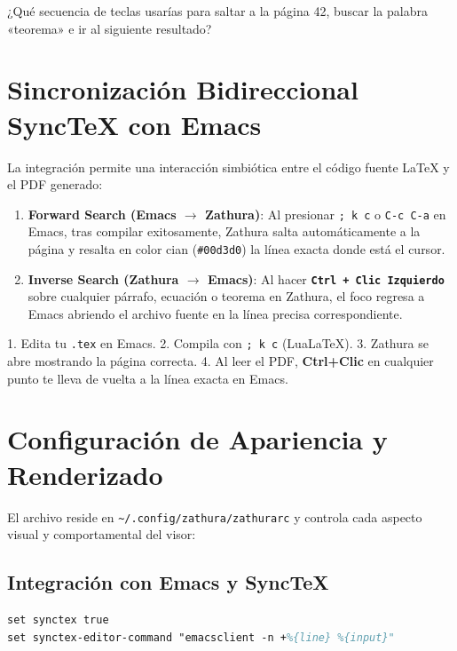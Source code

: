 \documentclass[11pt,article,spanish]{apuntes-scr}
\begin{document}
\begin{controlbox}[Autoevaluación]
  ¿Qué secuencia de teclas usarías para saltar a la página 42, buscar la palabra «teorema» e ir al siguiente resultado?
\end{controlbox}

\section{Sincronización Bidireccional SyncTeX con Emacs}
La integración permite una interacción simbiótica entre el código fuente \LaTeX{} y el PDF generado:
\begin{enumerate}[leftmargin=*]
    \item \textbf{Forward Search (Emacs $\to$ Zathura)}: Al presionar \texttt{; k c} o \texttt{C-c C-a} en Emacs, tras compilar exitosamente, Zathura salta automáticamente a la página y resalta en color cian (\texttt{\#00d3d0}) la línea exacta donde está el cursor.
    \item \textbf{Inverse Search (Zathura $\to$ Emacs)}: Al hacer \textbf{\texttt{Ctrl + Clic Izquierdo}} sobre cualquier párrafo, ecuación o teorema en Zathura, el foco regresa a Emacs abriendo el archivo fuente en la línea precisa correspondiente.
\end{enumerate}

\begin{notabox}
  1. Edita tu \texttt{.tex} en Emacs. 2. Compila con \texttt{; k c} (Lua\LaTeX). 3. Zathura se abre mostrando la página correcta. 4. Al leer el PDF, \textbf{Ctrl+Clic} en cualquier punto te lleva de vuelta a la línea exacta en Emacs.
\end{notabox}

\section{Configuración de Apariencia y Renderizado}
El archivo reside en \texttt{\textasciitilde/.config/zathura/zathurarc} y controla cada aspecto visual y comportamental del visor:

\subsection{Integración con Emacs y SyncTeX}
\begin{lstlisting}[language=TeX, basicstyle=\ttfamily\footnotesize, frame=single, backgroundcolor=\color{gray!5}]
set synctex true
set synctex-editor-command "emacsclient -n +%{line} %{input}"
\end{lstlisting}
\end{document}
